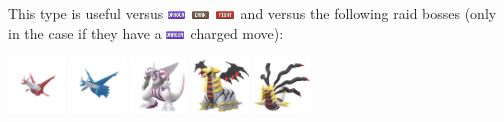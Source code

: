\documentclass[12pt]{beamer}
\newcommand{\fightingfull}{\includegraphics[height=0.2cm]{../../images/type/full/Fighting.png}}
\newcommand{\darkfull}{\includegraphics[height=0.2cm]{../../images/type/full/Dark.png}}
\newcommand{\dragonfull}{\includegraphics[height=0.2cm]{../../images/type/full/Dragon.png}}
\begin{document}
\begin{frame}[label=Fairy]
\begin{footnotesize}
\begin{block}{}\begin{center}
This type is useful versus \dragonfull~\darkfull~\fightingfull~and versus the following raid bosses (only in the case if they have a \dragonfull~charged move):

    \includegraphics[width=1.5cm]{../../images/pokemon/latias.png}
    \includegraphics[width=1.5cm]{../../images/pokemon/latios.png}
    \includegraphics[width=1.5cm]{../../images/pokemon/palkia.png}\quad
    \includegraphics[width=1.5cm]{../../images/pokemon/giratina_a.png}\quad
    \includegraphics[width=1.5cm]{../../images/pokemon/giratina_o.png}
\end{center}
\end{block}

\end{footnotesize}
\end{frame}



\end{document}
